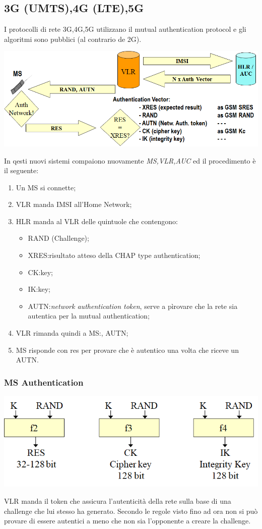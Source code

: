 \documentclass{book}
\theoremstyle{remark}
\begin{document}
\subsection{3G (UMTS),4G (LTE),5G}
I protocolli di rete 3G,4G,5G utilizzano il mutual authentication protocol e gli algoritmi sono pubblici (al contrario de 2G)\@.
\begin{center}
	\includegraphics[scale=0.4]{2g3g4g.png}
\end{center}
In qesti nuovi sistemi compaiono nuovamente \emph{MS,VLR,AUC} ed il procedimento è il seguente:\begin{enumerate}
	\item Un MS si connette;\@
	\item VLR manda IMSI all'Home Network;\@
	\item HLR manda al VLR delle quintuole che contengono:\begin{itemize}
		      \item RAND (Challenge)\@;
		      \item XRES:\@il risultato atteso della CHAP type authentication\@;
		      \item CK:\@cipher key\@;
		      \item IK:\@integrity key\@;
		      \item AUTN:\emph{network authentication token}, serve a pìrovare che la rete sia autentica per la mutual authentication;\@
	      \end{itemize}
	\item VLR rimanda quindi a MS:\@RAND, AUTN\@;
	\item MS risponde con res per provare che è autentico una volta che riceve un AUTN\@.
\end{enumerate}
\subsubsection{MS Authentication}
\begin{center}
	\includegraphics[scale=0.4]{msauth.png}
\end{center}
VLR manda il token che assicura l'autenticità della rete sulla base di una challenge che lui stesso ha generato\@. Secondo le regole visto fino ad ora non si può provare di essere autentici a meno che non sia l'opponente a creare la challenge\@.
\end{document}
